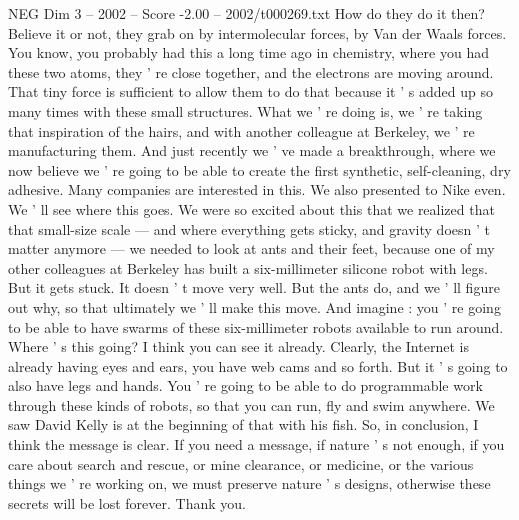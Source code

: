 \begin{textsample}{NEG Dim 3 – 2002 – Score -2.00 – 2002/t000269.txt}
How do they do it then?
Believe it or not, they grab on by intermolecular forces, by Van der Waals forces.
You know, you probably had this a long time ago in chemistry, where you had these two atoms, they ' re close together, and the electrons are moving around.
That tiny force is sufficient to allow them to do that because it ' s added up so many times with these small structures.
What we ' re doing is, we ' re taking that inspiration of the hairs, and with another colleague at Berkeley, we ' re manufacturing them.
And just recently we ' ve made a breakthrough, where we now believe we ' re going to be able to create the first synthetic, self-cleaning, dry adhesive.
Many companies are interested in this.
We also presented to Nike even.
We ' ll see where this goes.
We were so excited about this that we realized that that small-size scale — and where everything gets sticky, and gravity doesn ' t matter anymore — we needed to look at ants and their feet, because one of my other colleagues at Berkeley has built a six-millimeter silicone robot with legs.
But it gets stuck.
It doesn ' t move very well.
But the ants do, and we ' ll figure out why, so that ultimately we ' ll make this move.
And imagine : you ' re going to be able to have swarms of these six-millimeter robots available to run around.
Where ' s this going?
I think you can see it already.
Clearly, the Internet is already having eyes and ears, you have web cams and so forth.
But it ' s going to also have legs and hands.
You ' re going to be able to do programmable work through these kinds of robots, so that you can run, fly and swim anywhere.
We saw David Kelly is at the beginning of that with his fish.
So, in conclusion, I think the message is clear.
If you need a message, if nature ' s not enough, if you care about search and rescue, or mine clearance, or medicine, or the various things we ' re working on, we must preserve nature ' s designs, otherwise these secrets will be lost forever.
Thank you.

\end{textsample}
